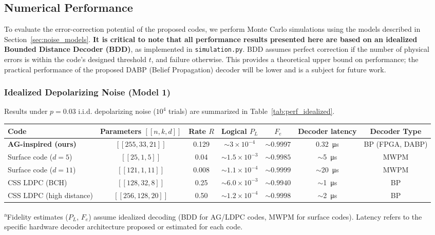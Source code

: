 \documentclass[conference]{IEEEtran}
\begin{document}
\subsection{Numerical Performance}\label{sec:comparison}

To evaluate the error-correction potential of the proposed codes, we perform Monte Carlo simulations using the models described in Section~\ref{sec:noise_models}. \textbf{It is critical to note that all performance results presented here are based on an idealized Bounded Distance Decoder (BDD)}, as implemented in \texttt{simulation.py}. BDD assumes perfect correction if the number of physical errors is within the code's designed threshold \(t\), and failure otherwise. This provides a theoretical upper bound on performance; the practical performance of the proposed DABP (Belief Propagation) decoder will be lower and is a subject for future work.

\subsubsection{Idealized Depolarizing Noise (Model 1)}
Results under \(p=0.03\) i.i.d. depolarizing noise (\(10^4\) trials) are summarized in Table~\ref{tab:perf_idealized}.

\begin{table*}[t]
\centering
\caption{Performance under Model 1 (depolarizing \(p=0.03\), i.i.d.).\textsuperscript{a}}
\label{tab:perf_idealized}
\begin{tabular}{lcccccc}
\toprule
\textbf{Code} & \textbf{Parameters $[[n,k,d]]$} & \textbf{Rate $R$} & \textbf{Logical $P_L$} & \textbf{$F_e$} & \textbf{Decoder latency} & \textbf{Decoder Type} \\
\midrule
\textbf{AG-inspired (ours)} & $[[255,33,21]]$ & 0.129 & \(\sim 3\times 10^{-4}\) & \(\sim 0.9997\) & \SI{0.32}{\micro\second} & BP (FPGA, DABP) \\
Surface code ($d=5$) & $[[25,1,5]]$ & 0.04 & \(\sim 1.5\times 10^{-3}\) & \(\sim 0.9985\) & \(\sim\)\SI{5}{\micro\second} & MWPM \\
Surface code ($d=11$) & $[[121,1,11]]$ & 0.008 & \(\sim 1.1\times 10^{-4}\) & \(\sim 0.9999\) & \(\sim\)\SI{20}{\micro\second} & MWPM \\
CSS LDPC (BCH) & $[[128,32,8]]$ & 0.25 & \(\sim 6.0\times 10^{-3}\) & \(\sim 0.9940\) & \(\sim\)\SI{1}{\micro\second} & BP \\
CSS LDPC (high distance) & $[[256,128,20]]$ & 0.50 & \(\sim 1.2\times 10^{-4}\) & \(\sim 0.9998\) & \(\sim\)\SI{2}{\micro\second} & BP \\
\bottomrule
\end{tabular}
\textsuperscript{a}{\footnotesize Fidelity estimates ($P_L$, $F_e$) assume idealized decoding (BDD for AG/LDPC codes, MWPM for surface codes). Latency refers to the specific hardware decoder architecture proposed or estimated for each code.}
\end{table*}
\end{document}
